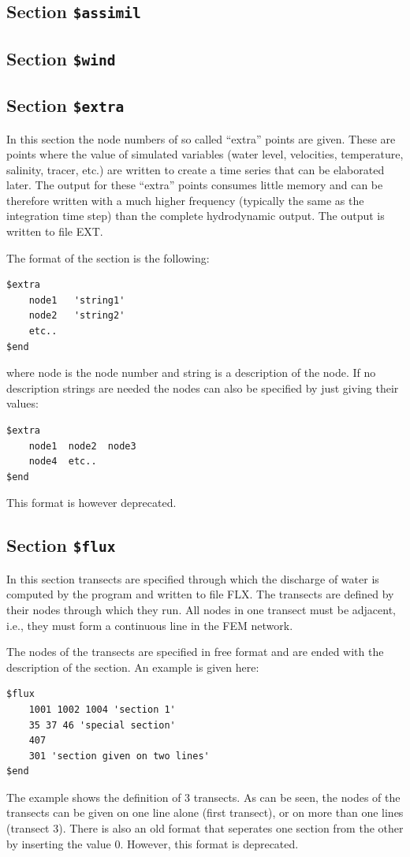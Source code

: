 \documentclass{report}
\begin{document}
\subsection{Section {\tt \$assimil}}


\subsection{Section {\tt \$wind}}



\subsection{Section {\tt \$extra}}

In this section the node numbers of so called ``extra'' points are given. 
These are points where the value of simulated variables (water level, 
velocities, temperature, salinity, tracer, etc.) are written to create
a time series that can be elaborated later. The output for these ``extra''
points consumes little memory and can be therefore written with a
much higher frequency (typically the same as the integration time step)
than the complete hydrodynamic output. The output is written
to file EXT.

The format of the section is the following:
\begin{verbatim}
$extra
	node1   'string1'
	node2   'string2'
	etc..
$end
\end{verbatim}
where node is the node number and string is a description of the node.
If no description strings are needed the nodes can also be specified
by just giving their values:
\begin{verbatim}
$extra
	node1  node2  node3
	node4  etc..
$end
\end{verbatim}
This format is however deprecated.


\subsection{Section {\tt \$flux}}

In this section transects are specified through which the discharge
of water is computed by the program and written to file FLX.
The transects are defined by their nodes through which they run.
All nodes in one transect must be adjacent, i.e., they must form a
continuous line in the FEM network.

The nodes of the transects are specified in free format and are
ended with the description of the section.
An example is given here:
\begin{verbatim}
$flux
	1001 1002 1004 'section 1'
	35 37 46 'special section'
	407
	301 'section given on two lines'
$end
\end{verbatim}
The example shows the definition of 3 transects. As can be seen, the 
nodes of the transects can be given on one line alone (first transect),
or on more than one lines (transect 3).
There is also an old format that seperates one section from the other by
inserting the value 0. However, this format is deprecated.
\end{document}
